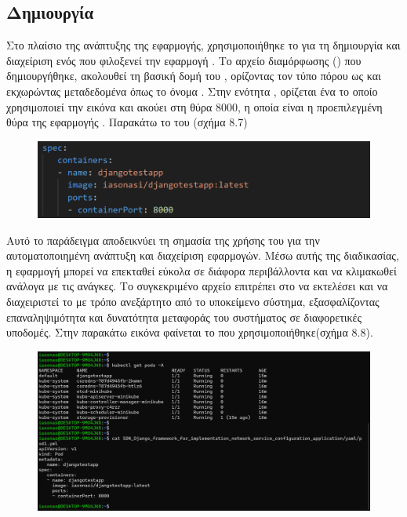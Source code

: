 \subsection{Δημιουργία }

Στο πλαίσιο της ανάπτυξης της εφαρμογής, χρησιμοποιήθηκε το 
 για τη δημιουργία και διαχείριση ενός  
που φιλοξενεί την εφαρμογή . Το αρχείο διαμόρφωσης 
() που δημιουργήθηκε, ακολουθεί τη βασική δομή του , 
ορίζοντας τον τύπο πόρου ως  και 
εκχωρώντας μεταδεδομένα όπως το όνομα . 
Στην ενότητα , ορίζεται ένα  
το οποίο χρησιμοποιεί την εικόνα  
και ακούει στη θύρα 8000, η οποία είναι η προεπιλεγμένη θύρα της 
εφαρμογής . Παρακάτω το  του (σχήμα 8.7)

\FloatBarrier

\begin{figure}[h]
	\centering
	\includegraphics[width=1.0\textwidth]{graphics/pod_spec.png}
	\caption{}
\end{figure}

\FloatBarrier

Αυτό το παράδειγμα αποδεικνύει τη σημασία της χρήσης του  
για την αυτοματοποιημένη ανάπτυξη και διαχείριση  
εφαρμογών. Μέσω αυτής της διαδικασίας, η εφαρμογή μπορεί να 
επεκταθεί εύκολα σε διάφορα περιβάλλοντα και να κλιμακωθεί 
ανάλογα με τις ανάγκες. Το συγκεκριμένο αρχείο  
επιτρέπει στο  να εκτελέσει και να διαχειριστεί το 
 με τρόπο ανεξάρτητο από το υποκείμενο σύστημα, 
εξασφαλίζοντας επαναληψιμότητα και δυνατότητα μεταφοράς του 
συστήματος σε διαφορετικές υποδομές. Στην παρακάτω εικόνα φαίνεται το 
 που χρησιμοποιήθηκε(σχήμα 8.8). 

\FloatBarrier

\begin{figure}[h]
	\centering
	\includegraphics[width=1.0\textwidth]{graphics/deploy_django.png}
	\caption{}
\end{figure}

